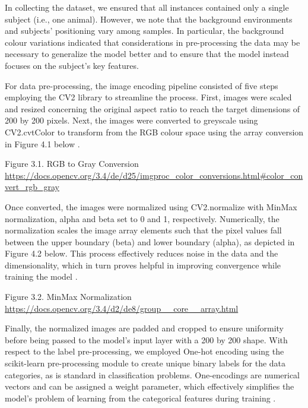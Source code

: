 \documentclass{article}
\begin{document}
In collecting the dataset, we ensured that all instances contained only a single subject (i.e., one animal). However, we note that the background environments and subjects’ positioning vary among samples. In particular, the background colour variations indicated that considerations in pre-processing the data may be necessary to generalize the model better and to ensure that the model instead focuses on the subject’s key features. 

For data pre-processing, the image encoding pipeline consisted of five steps employing the CV2 library \cite{opencv_library} to streamline the process. First, images were scaled and resized concerning the original aspect ratio to reach the target dimensions of 200 by 200 pixels. Next, the images were converted to greyscale using CV2.cvtColor to transform from the RGB colour space using the array conversion in Figure 4.1 below \cite{opencv_library}. 


Figure 3.1. RGB to Gray Conversion \url{https://docs.opencv.org/3.4/de/d25/imgproc_color_conversions.html#color_convert_rgb_gray}

Once converted, the images were normalized using CV2.normalize with MinMax normalization, alpha and beta set to 0 and 1, respectively. Numerically, the normalization scales the image array elements such that the pixel values fall between the upper boundary (beta) and lower boundary (alpha), as depicted in Figure 4.2 below. This process effectively reduces noise in the data and the dimensionality, which in turn proves helpful in improving convergence while training the model \cite{opencv_library}.

Figure 3.2. MinMax Normalization 
\url{https://docs.opencv.org/3.4/d2/de8/group__core__array.html}

Finally, the normalized images are padded and cropped to ensure uniformity before being passed to the model's input layer with a 200 by 200 shape. With respect to the label pre-processing, we employed One-hot encoding using the scikit-learn \cite{scikit-learn} pre-processing module to create unique binary labels for the data categories, as is standard in classification problems. One-encodings are numerical vectors and can be assigned a weight parameter, which effectively simplifies the model's problem of learning from the categorical features during training \cite{seger2018investigation}. 
\end{document}
